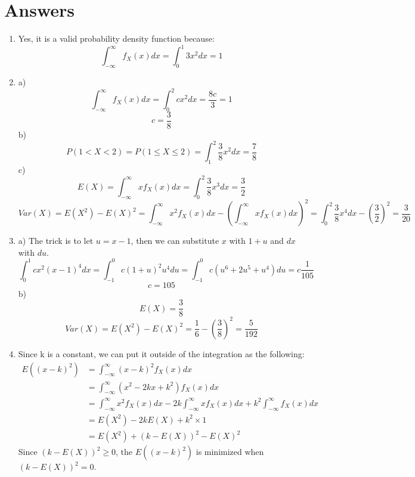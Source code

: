 \documentclass[11pt]{article}
\begin{document}
\section{Answers}
\begin{enumerate}
  \item Yes, it is a valid probability density function because:
  $$ \int_{-\infty}^{\infty} f_X(x)dx = \int_{0}^{1} 3x^2dx = 1$$
  \item 
  a) 
  $$ \int_{-\infty}^{\infty} f_X(x)dx = \int_{0}^{2} cx^2dx = \frac{8c}{3} = 1$$
  $$ c = \frac{3}{8} $$
  b)
  $$ P(1 < X < 2) = P(1 \leq X \leq 2) = \int_{1}^{2} \frac{3}{8} x^2dx = \frac{7}{8} $$
  c)   
  $$ E(X) = \int_{-\infty}^{\infty} xf_X(x)dx = \int_{0}^{2} \frac{3}{8} x^3 dx = \frac{3}{2}$$
  $$ Var(X) = E(X^2) - E(X)^2 = \int_{-\infty}^{\infty} x^2f_X(x)dx - (\int_{-\infty}^{\infty} xf_X(x)dx)^2 = \int_{0}^{2} \frac{3}{8} x^4 dx - (\frac{3}{2})^2 = \frac{3}{20} $$
  \item a) 
  The trick is to let $u = x-1$, then we can substitute $x$ with $ 1 + u $ and $dx$ with $du$.
  $$ \int_{0}^{1} c x^2(x-1)^4 dx = \int_{-1}^{0} c (1+u)^2u^4 du = \int_{-1}^{0} c (u^6 + 2u^5 + u^4) du = c \frac{1}{105} $$
  $$  c = 105 $$
  b) 
  $$ E(X) = \frac{3}{8}$$
  $$ Var(X) = E(X^2) - E(X)^2 = \frac{1}{6} - (\frac{3}{8})^2 = \frac{5}{192}$$
  \item Since k is a constant, we can put it outside of the integration as the following:
  \begin{align*}
    E((x - k)^2) &= \int_{-\infty}^{\infty} (x - k)^2 f_X(x) dx
    \\ &= \int_{-\infty}^{\infty} (x^2 - 2kx + k^2) f_X(x) dx 
    \\ &= \int_{-\infty}^{\infty} x^2 f_X(x) dx - 2k \int_{-\infty}^{\infty} xf_X(x)dx + k^2 \int_{-\infty}^{\infty} f_X(x)dx
    \\ &= E(X^2) - 2kE(X) + k^2 \times 1
    \\ &= E(X^2) + (k-E(X))^2 - E(X)^2
  \end{align*}
  Since $(k-E(X))^2 \geq 0$, the $ E((x - k)^2)$ is minimized when $(k-E(X))^2 = 0$.
\end{enumerate}
\end{document}
